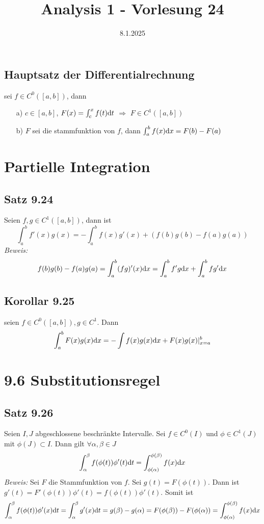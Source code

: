 \documentclass[]{scrartcl}
\title{Analysis 1 - Vorlesung 24}
\author{}
\date{8.1.2025}
\begin{document}
\maketitle
\newpage
\tableofcontents
\newpage

\subsection{Hauptsatz der Differentialrechnung} 
sei $f\in C^0([a,b])$, dann
\begin{itemize}
	\item[a)] $c\in[a,b]$, $F(x) = \int_c^x f(t)\text dt$ $\Rightarrow$ $F\in C^1([a,b])$
		\item[b)] $F$ sei die stammfunktion von $f$, dann $\int_a^b f(x) \text dx = F(b)-F(a)$
\end{itemize}

\section{Partielle Integration}

\subsection{Satz 9.24}
Seien $f,g\in C^1([a,b])$, dann ist 
$$
\int_a^b f'(x)g(x) = -\int_a^b f(x)g'(x) + (f(b)g(b) - f(a)g(a))
$$
\textit{Beweis: }
$$
f(b)g(b)-f(a)g(a) = \int_a^b (fg)'(x)\text dx = \int_a^b f'g \text dx + \int_a^b fg' \text dx
$$

\subsection{Korollar 9.25}
seien $f\in C^0([a,b]), g\in C^1$. Dann
$$
\int_a^b F(x)g(x) \text dx = -\int f(x)g(x)\text dx + F(x)g(x)|_{x=a}^b
$$

\section{9.6 Substitutionsregel}
\subsection{Satz 9.26}
Seien $I,J$ abgeschlossene beschränkte Intervalle. Sei $f\in C^0(I)$ und $\phi\in C^1(J)$ mit $\phi(J)\subset I$. Dann gilt $\forall \alpha,\beta \in J$
$$
\int_\alpha^\beta f(\phi(t))\phi'(t)\text dt = \int_{\phi(\alpha)}^{\phi(\beta)} f(x)\text dx
$$
\textit{Beweis: }
Sei $F$ die Stammfunktion von $f$. Sei $g(t) = F(\phi(t))$. Dann ist $g'(t) = F'(\phi(t))\phi'(t) = f(\phi(t))\phi'(t).$ Somit ist
$$
\int_\alpha^\beta f(\phi(t))\phi'(x) \text dt = \int_\alpha^\beta g'(x)\text dt = g(\beta) - g(\alpha) = F(\phi(\beta)) - F(\phi(\alpha)) = \int_{\phi(\alpha)}^{\phi(\beta)}f(x)\text dx
$$
\end{document}
